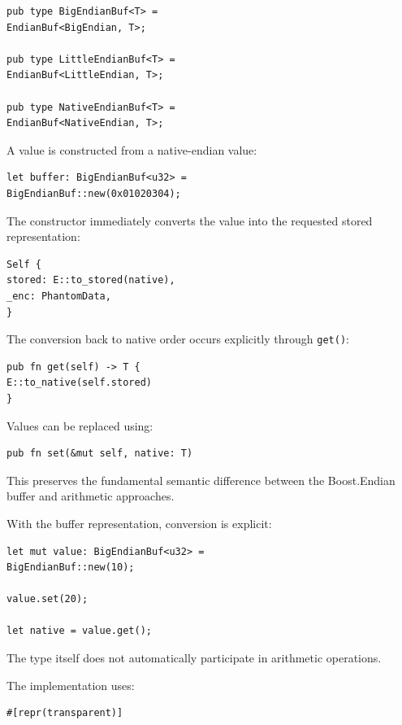 \begin{lstlisting}[style=rustblock]
pub type BigEndianBuf<T> =
EndianBuf<BigEndian, T>;

pub type LittleEndianBuf<T> =
EndianBuf<LittleEndian, T>;

pub type NativeEndianBuf<T> =
EndianBuf<NativeEndian, T>;
\end{lstlisting}

A value is constructed from a native-endian value:

\begin{lstlisting}[style=rustblock]
let buffer: BigEndianBuf<u32> =
BigEndianBuf::new(0x01020304);
\end{lstlisting}

The constructor immediately converts the value into the requested stored representation:

\begin{lstlisting}[style=rustblock]
Self {
stored: E::to_stored(native),
_enc: PhantomData,
}
\end{lstlisting}

The conversion back to native order occurs explicitly through \texttt{get()}:

\begin{lstlisting}[style=rustblock]
pub fn get(self) -> T {
E::to_native(self.stored)
}
\end{lstlisting}

Values can be replaced using:

\begin{lstlisting}[style=rustblock]
pub fn set(&mut self, native: T)
\end{lstlisting}

This preserves the fundamental semantic difference between the Boost.Endian buffer and arithmetic approaches.

With the buffer representation, conversion is explicit:

\begin{lstlisting}[style=rustblock]
let mut value: BigEndianBuf<u32> =
BigEndianBuf::new(10);

value.set(20);

let native = value.get();
\end{lstlisting}

The type itself does not automatically participate in arithmetic operations.

The implementation uses:

\begin{lstlisting}[style=rustblock]
#[repr(transparent)]
\end{lstlisting}

